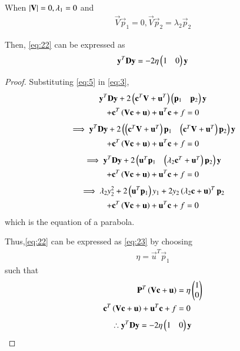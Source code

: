 \documentclass[journal,12pt,twocolumn]{IEEEtran}
\begin{document}
\begin{theorem}
When $\left\vert\mathbf{V}\right\vert = 0, \lambda_1 = 0$ and 
\begin{align}
\vec{V}\vec{p}_1 = 0, 
\vec{V}\vec{p}_2 = \lambda_2\vec{p}_2
\end{align}

Then, \eqref{eq:22} can be expressed as 
\begin{align}
\mathbf{y}^T\mathbf{D}\mathbf{y} = -2\eta\begin{pmatrix}1 & 0\end{pmatrix}\mathbf{y} \label{eq:23}
\end{align}
\end{theorem}
\begin{proof}
Substituting \eqref{eq:5} in \eqref{eq:3},
\begin{multline}
\mathbf{y}^T\mathbf{D}\mathbf{y}+2\left(\mathbf{c}^T\mathbf{V}+\mathbf{u}^T\right)\begin{pmatrix}\mathbf{p}_1 & \mathbf{p}_2\end{pmatrix}\mathbf{y}
\\
+  \mathbf{c}^T\left(\mathbf{V}\mathbf{c} + \mathbf{u}\right)+ \mathbf{u}^T\mathbf{c} + f= 0
\end{multline}
\begin{multline}
\implies
\mathbf{y}^T\mathbf{D}\mathbf{y}+2\begin{pmatrix}\left(\mathbf{c}^T\mathbf{V}+\mathbf{u}^T\right)\mathbf{p}_1 & \left(\mathbf{c}^T\mathbf{V}+\mathbf{u}^T\right)\mathbf{p}_2\end{pmatrix}\mathbf{y}
\\
+  \mathbf{c}^T\left(\mathbf{V}\mathbf{c} + \mathbf{u}\right)+ \mathbf{u}^T\mathbf{c} + f= 0
\end{multline}
\begin{multline}
\implies \mathbf{y}^T\mathbf{D}\mathbf{y}+2\begin{pmatrix}\mathbf{u}^T\mathbf{p}_1 & \left(\lambda_2\mathbf{c}^T+\mathbf{u}^T\right)\mathbf{p}_2\end{pmatrix}\mathbf{y}
\\
+  \mathbf{c}^T\left(\mathbf{V}\mathbf{c} + \mathbf{u}\right)+ \mathbf{u}^T\mathbf{c} + f= 0
\end{multline}
\begin{multline}
\implies \lambda_2y_2^2+2\left(\mathbf{u}^T\mathbf{p}_1\right)y_1+  2y_2\left(\lambda_2\mathbf{c}+\mathbf{u}\right)^T\mathbf{p}_2
\\
+  \mathbf{c}^T\left(\mathbf{V}\mathbf{c} + \mathbf{u}\right)+ \mathbf{u}^T\mathbf{c} + f= 0\label{eq:6}
\end{multline}
which is the equation of a parabola.

Thus,\eqref{eq:22} can be expressed as \eqref{eq:23} by choosing
\begin{align}
\eta = \vec{u}^T\vec{p}_1
\end{align}
such that
\begin{align}
\label{eq:7}
\mathbf{P}^{T}\left(\mathbf{V}\mathbf{c}+\mathbf{u}\right) &= \eta\begin{pmatrix}1\\0\end{pmatrix}
\\
\mathbf{c}^T\left(\mathbf{V}\mathbf{c} + \mathbf{u}\right)+ \mathbf{u}^T\mathbf{c} + f&= 0
\label{eq:8}
\end{align}
\begin{align}
\therefore 
\mathbf{y}^T\mathbf{D}\mathbf{y} = -2\eta\begin{pmatrix}1 & 0\end{pmatrix}\mathbf{y} \label{eq:11}
\end{align}
\end{proof}
\end{document}
